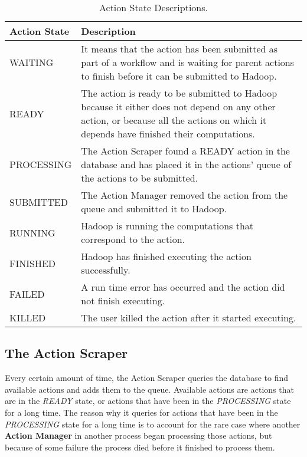 \begin{table}
\begin{tabular}{| l | p{12cm} |}

\hline
\textbf{Action State} & \textbf{Description} \\ \hline
WAITING & It means that the action has been submitted as part of a workflow and is waiting for parent actions to finish before it can be submitted to Hadoop.\\ \hline
READY & The action is ready to be submitted to Hadoop because it either does not depend on any other action, or because all the actions on which it depends have finished their computations. \\ \hline
PROCESSING & The Action Scraper found a READY action in the database and has placed it in the actions' queue of the actions to be submitted. \\ \hline
SUBMITTED & The Action Manager removed the action from the queue and submitted it to Hadoop. \\ \hline
RUNNING & Hadoop is running the computations that correspond to the action. \\ \hline
FINISHED & Hadoop has finished executing the action successfully.\\ \hline
FAILED & A run time error has occurred and the action did not finish executing.\\ \hline
KILLED & The user killed the action after it started executing.\\ \hline
\end{tabular}
\caption{Action State Descriptions.\label{tab:action_states}}
\end{table}

\subsection{The Action Scraper}
Every certain amount of time, the Action Scraper queries the database to find available actions and adds them to the queue. Available actions are actions that are in the \textit{READY} state, or actions that have been in the \textit{PROCESSING} state for a long time. The reason why it queries for actions that have been in the \textit{PROCESSING} state for a long time is to account for the rare case where another \textbf{Action Manager} in another process began processing those actions, but because of some failure the process died before it finished to process them.

